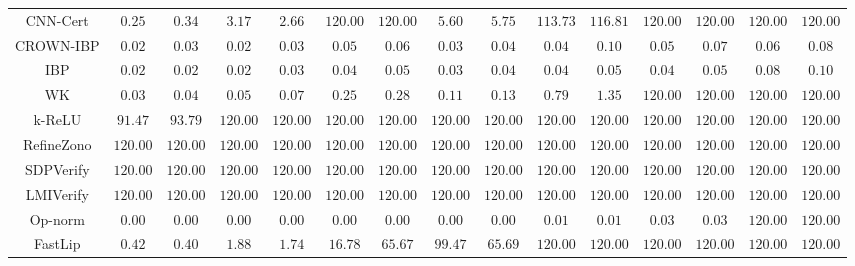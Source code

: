 \begin{table*}
{\begin{tabular}{c|c|c|c|c|c|c|c|c|c|c|c|c|c|c}
     CNN-Cert &        $0.25$ &        $0.34$ &        $3.17$ &        $2.66$ &      $120.00$ &      $120.00$ &        $5.60$ &        $5.75$ &      $113.73$ &      $116.81$ &      $120.00$ &      $120.00$ &      $120.00$ &      $120.00$ \\
    CROWN-IBP &        $0.02$ &        $0.03$ &        $0.02$ &        $0.03$ &        $0.05$ &        $0.06$ &        $0.03$ &        $0.04$ &        $0.04$ &        $0.10$ &        $0.05$ &        $0.07$ &        $0.06$ &        $0.08$ \\
          IBP &        $0.02$ &        $0.02$ &        $0.02$ &        $0.03$ &        $0.04$ &        $0.05$ &        $0.03$ &        $0.04$ &        $0.04$ &        $0.05$ &        $0.04$ &        $0.05$ &        $0.08$ &        $0.10$ \\
           WK &        $0.03$ &        $0.04$ &        $0.05$ &        $0.07$ &        $0.25$ &        $0.28$ &        $0.11$ &        $0.13$ &        $0.79$ &        $1.35$ &      $120.00$ &      $120.00$ &      $120.00$ &      $120.00$ \\
       k-ReLU &       $91.47$ &       $93.79$ &      $120.00$ &      $120.00$ &      $120.00$ &      $120.00$ &      $120.00$ &      $120.00$ &      $120.00$ &      $120.00$ &      $120.00$ &      $120.00$ &      $120.00$ &      $120.00$ \\
   RefineZono &      $120.00$ &      $120.00$ &      $120.00$ &      $120.00$ &      $120.00$ &      $120.00$ &      $120.00$ &      $120.00$ &      $120.00$ &      $120.00$ &      $120.00$ &      $120.00$ &      $120.00$ &      $120.00$ \\
    SDPVerify &      $120.00$ &      $120.00$ &      $120.00$ &      $120.00$ &      $120.00$ &      $120.00$ &      $120.00$ &      $120.00$ &      $120.00$ &      $120.00$ &      $120.00$ &      $120.00$ &      $120.00$ &      $120.00$ \\
    LMIVerify &      $120.00$ &      $120.00$ &      $120.00$ &      $120.00$ &      $120.00$ &      $120.00$ &      $120.00$ &      $120.00$ &      $120.00$ &      $120.00$ &      $120.00$ &      $120.00$ &      $120.00$ &      $120.00$ \\
      Op-norm &        $0.00$ &        $0.00$ &        $0.00$ &        $0.00$ &        $0.00$ &        $0.00$ &        $0.00$ &        $0.00$ &        $0.01$ &        $0.01$ &        $0.03$ &        $0.03$ &      $120.00$ &      $120.00$ \\
      FastLip &        $0.42$ &        $0.40$ &        $1.88$ &        $1.74$ &       $16.78$ &       $65.67$ &       $99.47$ &       $65.69$ &      $120.00$ &      $120.00$ &      $120.00$ &      $120.00$ &      $120.00$ &      $120.00$ \\

\end{tabular}}
\end{table*}
